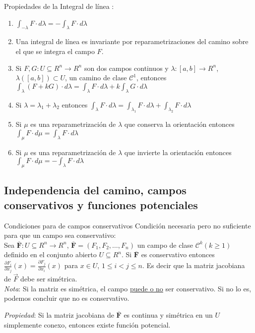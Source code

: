 \documentclass[a4paper, twoside]{article}
\numberwithin{equation}{section}
\numberwithin{figure}{section}
\numberwithin{table}{section}
\newcommand{\vect}[1]{\overline{\textbf{#1}}}
\begin{document}
\begin{corolario*}{Propiedades de la Integral de línea}
	:
	\begin{enumerate}
		\item $\int_{-\lambda}F\cdot d\lambda=-\int_{\lambda}F\cdot d\lambda$
		\item Una integral de línea es invariante por reparametrizaciones del camino sobre el que se integra el campo $F$.
		\item Si $F,G: U \subseteq R^n \to R^n$ son dos campos continuos y $\lambda:[a,b] \to R^n$, $\lambda \left([a,b]\right) \subset U$, un camino de clase $\mathcal{C}^1$, entonces $\int_{\lambda} \left(F+kG\right) \cdot d\lambda=\int_{\lambda}F \cdot d\lambda+k\int_{\lambda}G \cdot d\lambda$
		\item Si $\lambda=\lambda_1+\lambda_2$ entonces $\int_{\lambda}F \cdot d\lambda=\int_{\lambda_1}F \cdot d\lambda+\int_{\lambda_2}F\cdot d\lambda$
		\item Si $\mu$ es una reparametrización de $\lambda$ que conserva la orientación entonces $\int_{\mu}F \cdot d\mu=\int_{\lambda}F \cdot d\lambda$
		\item Si $\mu$ es una reparametrización de $\lambda$ que invierte la orientación entonces $\int_{\mu}F \cdot d\mu=-\int_{\lambda}F \cdot d\lambda$
	\end{enumerate}
\end{corolario*}

\subsection{Independencia del camino, campos conservativos y funciones potenciales}
\begin{teorema*}{Condiciones para de campos conservativos}
	Condición necesaria pero no suficiente para que un campo sea conservativo:\\
	
	Sea $\vect{F}:U\subseteq R^n \to R^n$, $\vect{F}=(F_1,F_2,\ldots,F_n)$ un campo de clase $\mathcal{C}^{k}(k\ge1)$ definido en el conjunto abierto $U \subseteq R^n$. Si $\vect{F}$ es conservativo entonces $\frac{\partial F_i}{\partial x_j}(x)=\frac{\partial F_j}{\partial x_i}(x)$ para $x \in U$, $1\le i<j\le n.$ Es decir que la matriz jacobiana de $\vec{F}$ debe ser simétrica.\\

	\textit{Nota}: Si la matriz es simétrica, el campo \underline{puede o no} ser conservativo. Si no lo es, podemos concluir que no es conservativo.

	\textit{Propiedad}: Si la matriz jacobiana de $\vect{F}$ es continua y simétrica en un $U$ simplemente conexo, entonces existe función potencial.
\end{teorema*}
\end{document}
